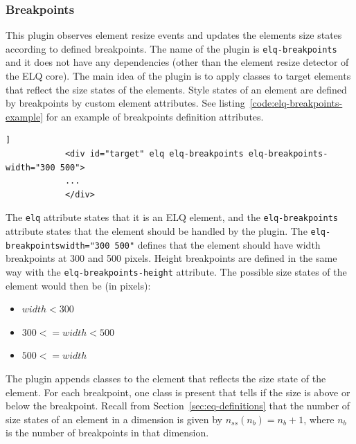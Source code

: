 \documentclass[a4paper,11pt]{kth-mag}
\newcommand{\code}[1]{\texttt{#1}}
\begin{document}
        \subsubsection{Breakpoints}\label{sec:plugin-breakpoints}
          This plugin observes element resize events and updates the \glspl{element} size states according to defined breakpoints.
          The name of the plugin is \code{elq-breakpoints} and it does not have any dependencies (other than the element resize detector of the \gls{ELQ} core).
          The main idea of the plugin is to apply classes to target \glspl{element} that reflect the size states of the \glspl{element}.
          Style states of an element are defined by breakpoints by custom element attributes.
          See listing~\ref{code:elq-breakpoints-example} for an example of breakpoints definition attributes.
          \begin{lstlisting}[gobble=12,caption={Example of an element that has two width breakpoints (300 and 500 pixels) defined by using the \code{elq-breakpoints} plugin.},captionpos=b,label={code:elq-breakpoints-example}]]
            <div id="target" elq elq-breakpoints elq-breakpoints-width="300 500">
            ...
            </div>
          \end{lstlisting}
          The \code{elq} attribute states that it is an \gls{ELQ} \gls{element}, and the \code{elq-breakpoints} attribute states that the \gls{element} should be handled by the plugin.
          The \code{elq-breakpoints\-width="300 500"} defines that the \gls{element} should have width breakpoints at 300 and 500 pixels.
          Height breakpoints are defined in the same way with the \code{elq-breakpoints-height} attribute.
          The possible size states of the \gls{element} would then be (in pixels):
          \begin{itemize}
            \item $width < 300$
            \item $300 <= width < 500$
            \item $500 <= width$
          \end{itemize}
          The plugin appends classes to the \gls{element} that reflects the size state of the \gls{element}.
          For each breakpoint, one class is present that tells if the size is above or below the breakpoint.
          Recall from Section~\ref{sec:eq-definitions} that the number of size states of an \gls{element} in a dimension is given by $n_{ss}(n_b) = n_b + 1$, where $n_b$ is the number of breakpoints in that dimension.
\end{document}
